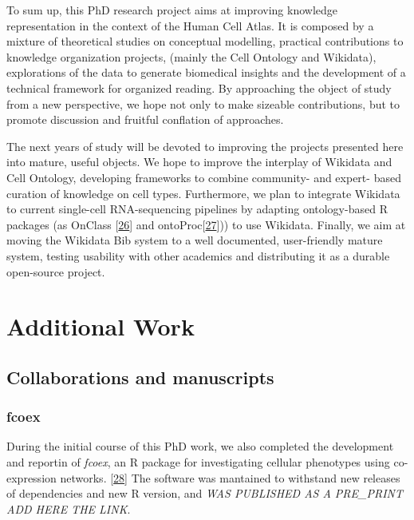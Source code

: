 To sum up, this PhD research project aims at improving knowledge representation in the context of the Human Cell Atlas.
It is composed by a mixture of theoretical studies on conceptual modelling, practical contributions to knowledge organization projects, (mainly the Cell Ontology and Wikidata), explorations of the data to generate biomedical insights and the development of a technical framework for organized reading.
By approaching the object of study from a new perspective, we hope not only to make sizeable contributions, but to promote discussion and fruitful conflation of approaches.

The next years of study will be devoted to improving the projects presented here into mature, useful objects.
We hope to improve the interplay of Wikidata and Cell Ontology, developing frameworks to combine community- and expert- based curation of knowledge on cell types.
Furthermore, we plan to integrate Wikidata to current single-cell RNA-sequencing pipelines by adapting ontology-based R packages (as OnClass {[}\protect\hyperlink{ref-sW6aNZJB}{26}{]} and ontoProc{[}\protect\hyperlink{ref-15YmDXALp}{27}{]})) to use Wikidata.
Finally, we aim at moving the Wikidata Bib system to a well documented, user-friendly mature system, testing usability with other academics and distributing it as a durable open-source project.

\hypertarget{additional-work}{%
\section{Additional Work}\label{additional-work}}

\hypertarget{collaborations-and-manuscripts}{%
\subsection{Collaborations and manuscripts}\label{collaborations-and-manuscripts}}

\hypertarget{fcoex}{%
\subsubsection{fcoex}\label{fcoex}}

During the initial course of this PhD work, we also completed the development and reportin of \emph{fcoex}, an R package for investigating cellular phenotypes using co-expression networks. {[}\protect\hyperlink{ref-MxIeSJYt}{28}{]} The software was mantained to withstand new releases of dependencies and new R version, and \emph{WAS PUBLISHED AS A PRE\_PRINT ADD HERE THE LINK}.

